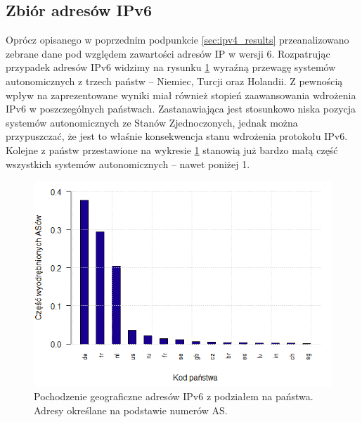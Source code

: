 \subsection{Zbiór adresów IPv6}
Oprócz opisanego w poprzednim podpunkcie \ref{sec:ipv4_results} przeanalizowano zebrane dane pod względem zawartości adresów IP
w wersji 6. Rozpatrując przypadek adresów IPv6 widzimy na rysunku \ref{fig:ipv6_as_countries} wyraźną przewagę systemów autonomicznych
z trzech państw -- Niemiec, Turcji oraz Holandii. Z pewnością wpływ na zaprezentowane wyniki miał również stopień zaawansowania
wdrożenia IPv6 w poszczególnych państwach. Zastanawiająca jest stosunkowo niska pozycja systemów autonomicznych ze Stanów Zjednoczonych,
jednak można przypuszczać, że jest to właśnie konsekwencja stanu wdrożenia protokołu IPv6. Kolejne z państw przestawione na
wykresie \ref{fig:ipv6_as_countries} stanowią już bardzo małą część wszystkich systemów autonomicznych -- nawet poniżej 1\textperthousand.
\begin{figure}[ht]
	\centering
	\includegraphics[width=1.0\textwidth]{image/ipv6_countries_no_title}
	\caption{Pochodzenie geograficzne adresów IPv6 z podziałem na państwa. Adresy określane na podstawie numerów AS.}
	\label{fig:ipv6_as_countries}
\end{figure}

